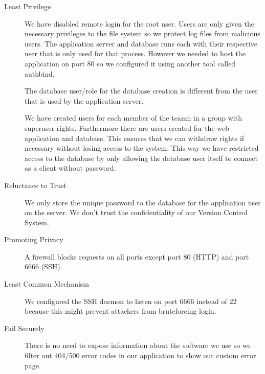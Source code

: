 \documentclass[a4paper]{article}
\begin{document}
\begin{description}
\item[Least Privilege] 

We have disabled remote login for the root user. Users are only given the necessary privileges to the file system so we protect log files from malicious users.
The application server and database runs each with their respective user that is only used for that process. However we needed to host the application on port 80 so we configured it using another tool called authbind.

The database user/role for the database creation is different from the user that is used by the application server. 

We have created users for each member of the teamn in a group with superuser rights. Furthermore there are users created for the web application and database.
This ensures that we can withdraw rights if necessary without losing access to the system.
This way we have restricted access to the database by only allowing the database user itself to connect as a client without password.

\item[Reluctance to Trust]
We only store the unique password to the database for the application user on the server. We don't trust the confidentiality of our Version Control System.

\item[Promoting Privacy]
A firewall blocks requests on all ports except port 80 (HTTP) and port 6666 (SSH).

\item[Least Common Mechanism]
We configured the SSH daemon to listen on port 6666 instead of 22 because this might prevent attackers from bruteforcing login.

\item[Fail Securely]
There is no need to expose information about the software we use so we filter out 404/500 error codes in our application to show our custom error page.
\end{description}
\end{document}
